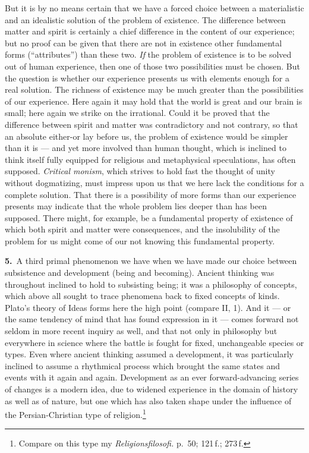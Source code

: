 \documentclass[12pt,a4paper]{book}
\newcommand{\opage}[1]{\marginnote{\footnotesize\textit{[#1]}}}
\begin{document}
But it is by no means certain that we have a forced choice between a
materialistic and an idealistic solution of the problem of existence. The
difference between matter and spirit is certainly a \opage{65}chief difference in the
content of our experience; but no proof can be given that there are not in
existence other fundamental forms (``attributes'') than these two. \emph{If} the
problem of existence is to be solved out of human experience, then one of those
two possibilities must be chosen. But the question is whether our experience
presents us with elements enough for a real solution. The richness of existence
may be much greater than the possibilities of our experience. Here again it may
hold that the world is great and our brain is small; here again we strike on the
irrational. Could it be proved that the difference between spirit and matter was
contradictory and not contrary, so that an absolute either-or lay before us, the
problem of existence would be simpler than it is --- and yet more involved than
human thought, which is inclined to think itself fully equipped for religious and
metaphysical speculations, has often supposed. \emph{Critical monism}, which
strives to hold fast the thought of unity without dogmatizing, must impress upon
us that we here lack the conditions for a complete solution. That there is a
possibility of more forms than our experience presents may indicate that the
whole problem lies deeper than has been supposed. There might, for example, be a
fundamental property of existence of which both spirit and matter were
consequences, and the insolubility of the problem for us might come of our not
knowing this fundamental property.

\noindent\textbf{5.}~A third primal phenomenon we have when we have made our
choice between subsistence and development (being and becoming). Ancient thinking
was throughout inclined to hold to subsisting being; it was a philosophy of
concepts, which above all sought to trace phenomena back to fixed concepts of
kinds. Plato's theory of Ideas forms here the high point (compare II, 1). And it
--- or the same tendency of mind that has found expression in it --- comes
forward not seldom in more recent inquiry as well, and that not only in
philosophy but everywhere in science where the battle is fought for fixed,
unchangeable species or types. Even where ancient thinking assumed a development,
it was particularly inclined to assume a rhythmical process which brought the
same states and events with it again and again. Development as an ever
forward-advancing series of changes is a modern idea, due to widened experience
in the domain of history \opage{66}as well as of nature, but one which has also taken shape
under the influence of the Persian-Christian type of religion.\footnote{Compare on
this type my \textit{Religionsfilosofi.} p.~50; 121\,f.; 273\,f.}
\end{document}
